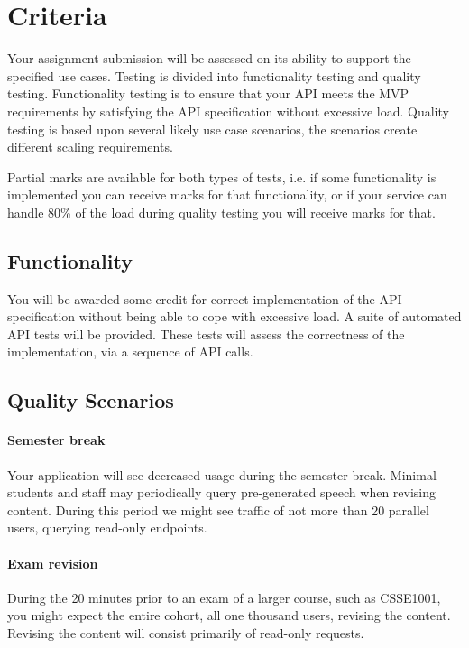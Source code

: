 \documentclass{csse4400}
\begin{document}
\section{Criteria}
Your assignment submission will be assessed on its ability to support the specified use cases.
Testing is divided into functionality testing and quality testing.
Functionality testing is to ensure that your API meets the MVP requirements by satisfying the API specification without excessive load.
Quality testing is based upon several likely use case scenarios,
the scenarios create different scaling requirements.

Partial marks are available for both types of tests,
i.e. if some functionality is implemented you can receive marks for that functionality,
or if your service can handle 80\% of the load during quality testing you will receive marks for that.

\subsection{Functionality}
You will be awarded some credit for correct implementation of the API specification without being able to cope with excessive load.
A suite of automated API tests will be provided.
These tests will assess the correctness of the implementation,
via a sequence of API calls.

\subsection{Quality Scenarios}

\paragraph{Semester break}
Your application will see decreased usage during the semester break.
Minimal students and staff may periodically query pre-generated speech when revising content.
During this period we might see traffic of not more than 20 parallel users,
querying read-only endpoints.


\paragraph{Exam revision}
During the 20 minutes prior to an exam of a larger course, such as CSSE1001,
you might expect the entire cohort, all one thousand users,
revising the content.
Revising the content will consist primarily of read-only requests.
\end{document}
